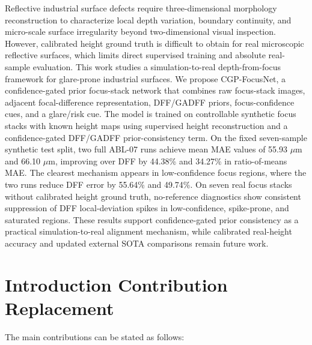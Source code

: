 \documentclass[11pt,a4paper]{article}
\newcommand{\method}{CGP-FocusNet}
\newcommand{\um}{\ensuremath{\mu\mathrm{m}}}
\begin{document}
Reflective industrial surface defects require three-dimensional morphology reconstruction to characterize local depth variation, boundary continuity, and micro-scale surface irregularity beyond two-dimensional visual inspection. However, calibrated height ground truth is difficult to obtain for real microscopic reflective surfaces, which limits direct supervised training and absolute real-sample evaluation. This work studies a simulation-to-real depth-from-focus framework for glare-prone industrial surfaces. We propose \method, a confidence-gated prior focus-stack network that combines raw focus-stack images, adjacent focal-difference representation, DFF/GADFF priors, focus-confidence cues, and a glare/risk cue. The model is trained on controllable synthetic focus stacks with known height maps using supervised height reconstruction and a confidence-gated DFF/GADFF prior-consistency term. On the fixed seven-sample synthetic test split, two full ABL-07 runs achieve mean MAE values of 55.93 \um{} and 66.10 \um{}, improving over DFF by 44.38\% and 34.27\% in ratio-of-means MAE. The clearest mechanism appears in low-confidence focus regions, where the two runs reduce DFF error by 55.64\% and 49.74\%. On seven real focus stacks without calibrated height ground truth, no-reference diagnostics show consistent suppression of DFF local-deviation spikes in low-confidence, spike-prone, and saturated regions. These results support confidence-gated prior consistency as a practical simulation-to-real alignment mechanism, while calibrated real-height accuracy and updated external SOTA comparisons remain future work.

\section*{Introduction Contribution Replacement}

The main contributions can be stated as follows:
\end{document}
